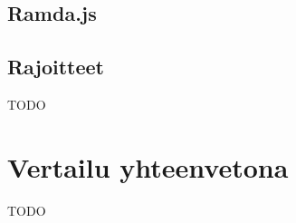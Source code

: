 


\subsection{Ramda.js}






\subsection{Rajoitteet}

TODO



\section{Vertailu yhteenvetona}

TODO

